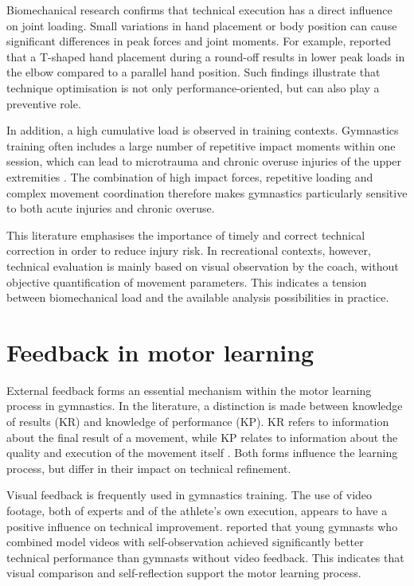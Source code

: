 Biomechanical research confirms that technical execution has a direct influence on joint loading. Small variations in hand placement or body position can cause significant differences in peak forces and joint moments. For example, \textcite{FARANA201588} reported that a T-shaped hand placement during a round-off results in lower peak loads in the elbow compared to a parallel hand position. Such findings illustrate that technique optimisation is not only performance-oriented, but can also play a preventive role.

In addition, a high cumulative load is observed in training contexts. Gymnastics training often includes a large number of repetitive impact moments within one session, which can lead to microtrauma and chronic overuse injuries of the upper extremities \autocite{Daly1999HighImpact}. The combination of high impact forces, repetitive loading and complex movement coordination therefore makes gymnastics particularly sensitive to both acute injuries and chronic overuse.

This literature emphasises the importance of timely and correct technical correction in order to reduce injury risk. In recreational contexts, however, technical evaluation is mainly based on visual observation by the coach, without objective quantification of movement parameters. This indicates a tension between biomechanical load and the available analysis possibilities in practice.

\section{Feedback in motor learning}
\label{sec:feedback-motorisch}
External feedback forms an essential mechanism within the motor learning process in gymnastics. In the literature, a distinction is made between knowledge of results (KR) and knowledge of performance (KP). KR refers to information about the final result of a movement, while KP relates to information about the quality and execution of the movement itself \autocite{Niznikowski2025}. Both forms influence the learning process, but differ in their impact on technical refinement.

Visual feedback is frequently used in gymnastics training. The use of video footage, both of experts and of the athlete's own execution, appears to have a positive influence on technical improvement. \textcite{Boyer2009} reported that young gymnasts who combined model videos with self-observation achieved significantly better technical performance than gymnasts without video feedback. This indicates that visual comparison and self-reflection support the motor learning process.


